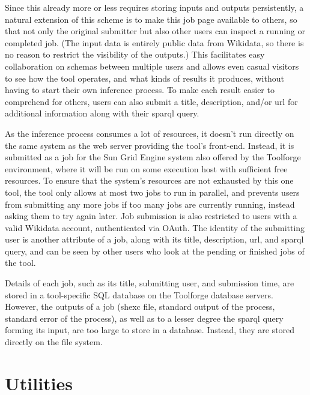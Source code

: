 Since this already more or less requires storing inputs and outputs persistently,
a natural extension of this scheme is to make this job page available to others,
so that not only the original submitter but also other users can inspect a running or completed job.
(The input data is entirely public data from \gls{Wikidata},
so there is no reason to restrict the visibility of the outputs.)
This facilitates easy collaboration on \glspl{schema} between multiple users
and allows even casual visitors to see how the tool operates,
and what kinds of results it produces,
without having to start their own inference process.
To make each result easier to comprehend for others,
users can also submit a title, description, and/or \gls{url} for additional information
along with their \gls{sparql} query. %

As the inference process consumes a lot of resources,
it doesn’t run directly on the same system as the web server providing the tool’s front-end.
Instead, it is submitted as a job for the Sun Grid Engine system also offered by the Toolforge environment,
where it will be run on some execution host with sufficient free resources.
To ensure that the system’s resources are not exhausted by this one tool,
the tool only allows at most two jobs to run in parallel,
and prevents users from submitting any more jobs if too many jobs are currently running,
instead asking them to try again later.
Job submission is also restricted to users with a valid \gls{Wikidata} account,
authenticated via OAuth.
The identity of the submitting user is another attribute of a job,
along with its title, description, \gls{url}, and \gls{sparql} query,
and can be seen by other users who look at the pending or finished jobs of the tool.

Details of each job,
such as its title, submitting user, and submission time,
are stored in a tool-specific SQL database on the Toolforge database servers.
However, the outputs of a job
(\gls{shexc} file, standard output of the process, standard error of the process),
as well as to a lesser degree the \gls{sparql} query forming its input,
are too large to store in a database.
Instead, they are stored directly on the file system.

\section{Utilities}
\label{sec:wdsi:utilities}

